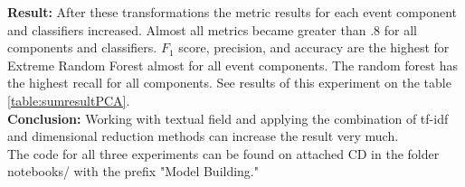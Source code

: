 \noindent\textbf{Result:} After these transformations the metric results for each event component and classifiers increased. Almost all metrics became greater than .8 for all components and classifiers. $F_1$ score, precision, and accuracy are the highest for Extreme Random Forest almost for all event components. The random forest has the highest recall for all components. See results of this experiment on the table \ref{table:sumresultPCA}.\\

\noindent\textbf{Conclusion:} Working with textual field and applying the combination of tf-idf and dimensional reduction methods can increase the result very much.\\

The code for all three experiments can be found on attached CD in the folder notebooks/ with the prefix "Model Building."



